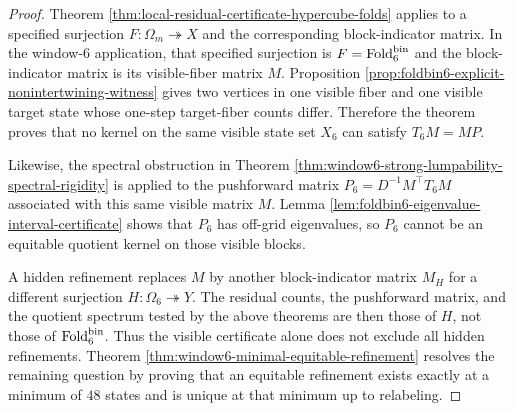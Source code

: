 \begin{proof}
Theorem \ref{thm:local-residual-certificate-hypercube-folds} applies to a specified surjection \(F:\Omega_m\twoheadrightarrow X\) and the corresponding block-indicator matrix.  In the window-\(6\) application, that specified surjection is \(F=\operatorname{Fold}_6^{\mathrm{bin}}\) and the block-indicator matrix is its visible-fiber matrix \(M\).  Proposition \ref{prop:foldbin6-explicit-nonintertwining-witness} gives two vertices in one visible fiber and one visible target state whose one-step target-fiber counts differ.  Therefore the theorem proves that no kernel on the same visible state set \(X_6\) can satisfy \(T_6M=MP\).

Likewise, the spectral obstruction in Theorem \ref{thm:window6-strong-lumpability-spectral-rigidity} is applied to the pushforward matrix \(P_6=D^{-1}M^\top T_6M\) associated with this same visible matrix \(M\).  Lemma \ref{lem:foldbin6-eigenvalue-interval-certificate} shows that \(P_6\) has off-grid eigenvalues, so \(P_6\) cannot be an equitable quotient kernel on those visible blocks.

A hidden refinement replaces \(M\) by another block-indicator matrix \(M_H\) for a different surjection \(H:\Omega_6\twoheadrightarrow Y\).  The residual counts, the pushforward matrix, and the quotient spectrum tested by the above theorems are then those of \(H\), not those of \(\operatorname{Fold}_6^{\mathrm{bin}}\).  Thus the visible certificate alone does not exclude all hidden refinements.  Theorem \ref{thm:window6-minimal-equitable-refinement} resolves the remaining question by proving that an equitable refinement exists exactly at a minimum of \(48\) states and is unique at that minimum up to relabeling. \qedhere
\end{proof}
